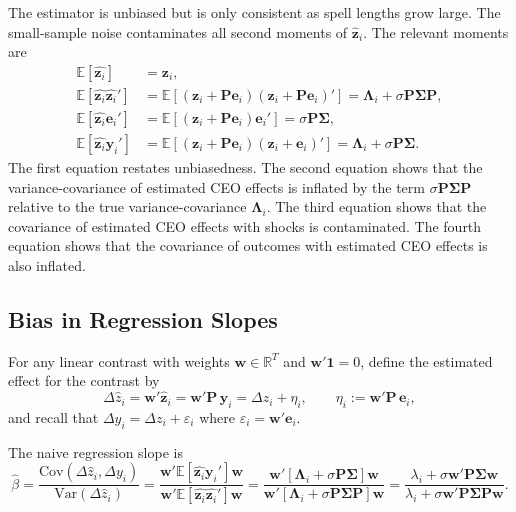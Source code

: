 \documentclass[11pt,a4paper]{article}
\newcommand{\Var}{\text{Var}}
\newcommand{\Cov}{\text{Cov}}
\begin{document}
The estimator is unbiased but is only consistent as spell lengths grow large. The small-sample noise contaminates all second moments of $\hat{\mathbf z}_i$. The relevant moments are
\begin{align}
  \mathbb E[\hat{\mathbf z_i}] &= \mathbf z_i,\\
  \mathbb E[\hat{\mathbf z_i}\hat{\mathbf z_i}'] &= 
\mathbb E[(\mathbf z_i + \mathbf P\mathbf e_i)(\mathbf z_i + \mathbf P\mathbf e_i)' ] =
    \mathbf \Lambda_i + \sigma\mathbf P\mathbf\Sigma\mathbf P,\\ 
  \mathbb E[\hat{\mathbf z_i}\mathbf e_i'] &= 
\mathbb E[(\mathbf z_i + \mathbf P\mathbf e_i)\mathbf e_i' ] = \sigma\mathbf P\mathbf\Sigma,\\
  \mathbb E[\hat{\mathbf z_i}\mathbf y_i'] &= 
\mathbb E[(\mathbf z_i + \mathbf P\mathbf e_i)(\mathbf z_i + \mathbf e_i)' ] = \mathbf \Lambda_i + \sigma\mathbf P\mathbf\Sigma.
\end{align}
The first equation restates unbiasedness. The second equation shows that the variance-covariance of estimated CEO effects is inflated by the term $\sigma\mathbf P\mathbf\Sigma\mathbf P$ relative to the true variance-covariance $\mathbf \Lambda_i$. The third equation shows that the covariance of estimated CEO effects with shocks is contaminated. The fourth equation shows that the covariance of outcomes with estimated CEO effects is also inflated.

\subsection{Bias in Regression Slopes}

For any linear contrast with weights $\mathbf w\in\mathbb R^T$ and $\mathbf w'\mathbf 1=0$, define the estimated effect for the contrast by
$$
\Delta\hat z_i = \mathbf w'\hat{\mathbf z}_i = \mathbf w'\mathbf P\,\mathbf y_i = \Delta z_i + \eta_i,\qquad \eta_i:=\mathbf w'\mathbf P\,\mathbf e_i,
$$
and recall that $\Delta y_i = \Delta z_i + \varepsilon_i$ where $\varepsilon_i=\mathbf w'\mathbf e_i$. 

The naive regression slope is
\begin{equation}
\hat\beta = 
  \frac {\Cov(\Delta \hat z_i, \Delta y_i)}
        {\Var(\Delta \hat z_i)} =
  \frac {\mathbf w' \mathbb E[\hat{\mathbf z_i}\mathbf y_i ']\mathbf w}
        {\mathbf w' \mathbb E[\hat{\mathbf z_i}\hat{\mathbf z_i}']\mathbf w} =
  \frac {\mathbf w' [\mathbf \Lambda_i + \sigma \mathbf P\mathbf\Sigma]\mathbf w}
        {\mathbf w' [\mathbf \Lambda_i + \sigma \mathbf P\mathbf\Sigma\mathbf P]\mathbf w} =
  \frac {\lambda_i + \sigma \mathbf w' \mathbf P\mathbf\Sigma \mathbf w}
        {\lambda_i + \sigma \mathbf w' \mathbf P\mathbf\Sigma \mathbf P \mathbf w}. 
\end{equation}  
\end{document}
